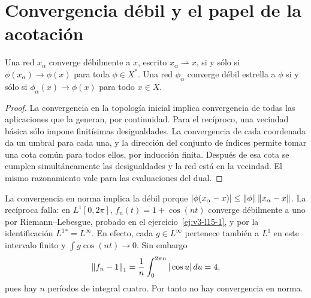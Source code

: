 \section{Convergencia débil y el papel de la acotación}\label{lec:v3-15}
\begin{proposicion}\label{v3:convergencia-debil}
Una red $x_\alpha$ converge débilmente a $x$, escrito $x_\alpha\rightharpoonup x$, si y sólo si $\phi(x_\alpha)\to\phi(x)$ para toda $\phi\in X^*$. Una red $\phi_\alpha$ converge débil estrella a $\phi$ si y sólo si $\phi_\alpha(x)\to\phi(x)$ para todo $x\in X$.
\end{proposicion}
\begin{proof}
La convergencia en la topología inicial implica convergencia de todas las aplicaciones que la generan, por continuidad. Para el recíproco, una vecindad básica sólo impone finitísimas desigualdades. La convergencia de cada coordenada da un umbral para cada una, y la dirección del conjunto de índices permite tomar una cota común para todos ellos, por inducción finita. Después de esa cota se cumplen simultáneamente las desigualdades y la red está en la vecindad. El mismo razonamiento vale para las evaluaciones del dual.
\end{proof}
La convergencia en norma implica la débil porque $|\phi(x_\alpha-x)|\le\left\lVert\phi\right\rVert\left\lVert x_\alpha-x\right\rVert$. La recíproca falla: en $L^1[0,2\pi]$, $f_n(t)=1+\cos(nt)$ converge débilmente a uno por Riemann--Lebesgue, probado en el ejercicio~\ref{ej:v3-l15-1}, y por la identificación $L^1{}^*=L^\infty$. En efecto, cada $g\in L^\infty$ pertenece también a $L^1$ en este intervalo finito y $\int g\cos(nt)\to0$. Sin embargo
\[\left\lVert f_n-1\right\rVert_1=\frac1n\int_0^{2\pi n}|\cos u|\,du=4,
\]
pues hay $n$ períodos de integral cuatro. Por tanto no hay convergencia en norma.


